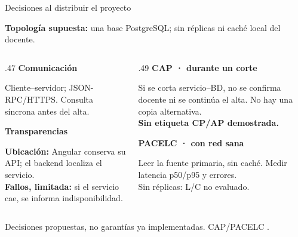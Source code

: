 \begin{frame}{Decisiones al distribuir el proyecto}\relax
{\small\textbf{Topología supuesta:} una base PostgreSQL; sin réplicas ni caché local del docente.\par}
\vspace{0mm}
\begin{columns}[T,onlytextwidth]
\begin{column}{.47\textwidth}
\textbf{Comunicación}\par
{\small Cliente--servidor; JSON-RPC/HTTPS. Consulta síncrona antes del alta.\par}
\medskip
\textbf{Transparencias}\par
{\small\textbf{Ubicación:} Angular conserva su API; el backend localiza el servicio.\\
\textbf{Fallos, limitada:} si el servicio cae, se informa indisponibilidad.\par}
\end{column}
\begin{column}{.49\textwidth}
\textbf{CAP · durante un corte}\par
{\small Si se corta servicio--BD, no se confirma docente ni se continúa el alta. No hay una copia alternativa.\\
\textbf{Sin etiqueta CP/AP demostrada.}\par}
\medskip
\textbf{PACELC · con red sana}\par
{\small Leer la fuente primaria, sin caché. Medir latencia p50/p95 y errores.\\
Sin réplicas: L/C no evaluado.\par}
\end{column}
\end{columns}
\vspace{2mm}
{\scriptsize Decisiones propuestas, no garantías ya implementadas. CAP/PACELC \cite{ahmed2023consistency}.}
\end{frame}

